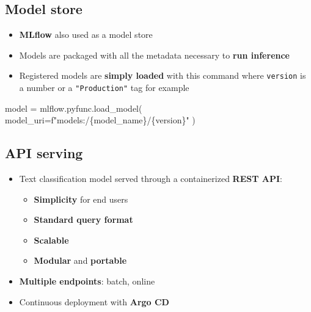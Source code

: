 \documentclass[
  letterpaper,
  DIV=11,
  numbers=noendperiod]{scrartcl}
\newenvironment{Shaded}{\begin{snugshade}}{\end{snugshade}}
\newcommand{\NormalTok}[1]{\textcolor[rgb]{0.00,0.23,0.31}{#1}}
\newcommand{\OperatorTok}[1]{\textcolor[rgb]{0.37,0.37,0.37}{#1}}
\newcommand{\SpecialCharTok}[1]{\textcolor[rgb]{0.37,0.37,0.37}{#1}}
\newcommand{\SpecialStringTok}[1]{\textcolor[rgb]{0.13,0.47,0.30}{#1}}
\providecommand{\tightlist}{%
  \setlength{\itemsep}{0pt}\setlength{\parskip}{0pt}}\usepackage{longtable,booktabs,array}
\begin{document}
\subsection{Model store}\label{model-store}

\begin{itemize}
\tightlist
\item
  {\textbf{MLflow}} also used as a model store
\item
  Models are packaged with all the metadata necessary to {\textbf{run
  inference}}
\item
  Registered models are {\textbf{simply loaded}} with this command where
  \texttt{version} is a number or a \texttt{"Production"} tag for
  example
\end{itemize}

\begin{Shaded}
\begin{Highlighting}[]
\NormalTok{model }\OperatorTok{=}\NormalTok{ mlflow.pyfunc.load\_model(}
\NormalTok{    model\_uri}\OperatorTok{=}\SpecialStringTok{f"models:/}\SpecialCharTok{\{}\NormalTok{model\_name}\SpecialCharTok{\}}\SpecialStringTok{/}\SpecialCharTok{\{}\NormalTok{version}\SpecialCharTok{\}}\SpecialStringTok{"}
\NormalTok{)}
\end{Highlighting}
\end{Shaded}

\subsection{API serving}\label{api-serving}

\begin{itemize}
\tightlist
\item
  Text classification model served through a containerized {\textbf{REST
  API}}:

  \begin{itemize}
  \tightlist
  \item
    {\textbf{Simplicity}} for end users
  \item
    {\textbf{Standard query format}}
  \item
    {\textbf{Scalable}}
  \item
    {\textbf{Modular}} and {\textbf{portable}}
  \end{itemize}
\item
  {\textbf{Multiple endpoints}}: batch, online
\item
  Continuous deployment with {\textbf{Argo CD}}
\end{itemize}
\end{document}
